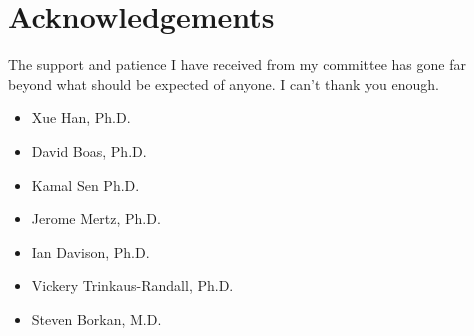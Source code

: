 \chapter*{Acknowledgements}\label{acknowledgements}

The support and patience I have received from my committee has gone far beyond what should be expected of anyone.
I can't thank you enough.
\begin{itemize}
	\item Xue Han, Ph.D.
	\item David Boas, Ph.D.
    \item Kamal Sen Ph.D.
	\item Jerome Mertz, Ph.D.
	\item Ian Davison, Ph.D.
	\item Vickery Trinkaus-Randall, Ph.D.
	\item Steven Borkan, M.D.
\end{itemize}

\vskip 1in
